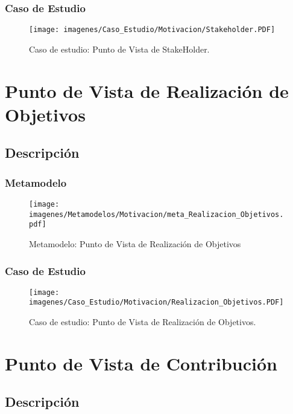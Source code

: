 \subsubsection{Caso de Estudio}


\begin{figure}[H]
	\centering
	\texttt{[image: imagenes/Caso\_Estudio/Motivacion/Stakeholder.PDF]}
	\caption{Caso de estudio: Punto de Vista de StakeHolder.}
	\label{fig:gap_analysis}
\end{figure}



\section{Punto de Vista de Realización de Objetivos}
\subsection{Descripción}

\subsubsection{Metamodelo}
\begin{figure}[H]
	\centering
	\texttt{[image: imagenes/Metamodelos/Motivacion/meta\_Realizacion\_Objetivos.pdf]}
	\caption{Metamodelo: Punto de Vista de Realización de Objetivos}
	\label{fig:gap_analysis}
\end{figure}

\subsubsection{Caso de Estudio}


\begin{figure}[H]
	\centering
	\texttt{[image: imagenes/Caso\_Estudio/Motivacion/Realizacion\_Objetivos.PDF]}
	\caption{Caso de estudio: Punto de Vista de Realización de Objetivos.}
	\label{fig:gap_analysis}
\end{figure}

\section{Punto de Vista de Contribución}
\subsection{Descripción}

